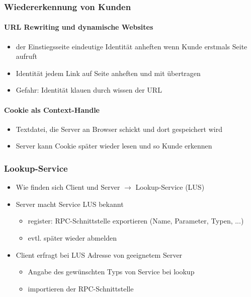 \documentclass[10pt,a4paper]{article}
\begin{document}
\subsubsection{Wiedererkennung von Kunden}
\paragraph{URL Rewriting und dynamische Websites}
\begin{itemize}
\item der Einstiegsseite eindeutige Identität anheften wenn Kunde erstmals Seite aufruft
\item Identität jedem Link auf Seite anheften und mit übertragen
\item Gefahr: Identität klauen durch wissen der URL
\end{itemize}

\paragraph{Cookie als Context-Handle}
\begin{itemize}
\item Textdatei, die Server an Browser schickt und dort gespeichert wird
\item Server kann Cookie später wieder lesen und so Kunde erkennen
\end{itemize}

\subsubsection{Lookup-Service}
\begin{itemize}
\item Wie finden sich Client und Server $\rightarrow$ Lookup-Service (LUS)
\item Server macht Service LUS bekannt
\begin{itemize}
\item register: RPC-Schnittstelle exportieren (Name, Parameter, Typen, ...)
\item evtl. später wieder abmelden
\end{itemize}
\item Client erfragt bei LUS Adresse von geeignetem Server
\begin{itemize}
\item Angabe des gewünschten Typs von Service bei lookup
\item importieren der RPC-Schnittstelle
\end{itemize}
\end{itemize}
\end{document}
